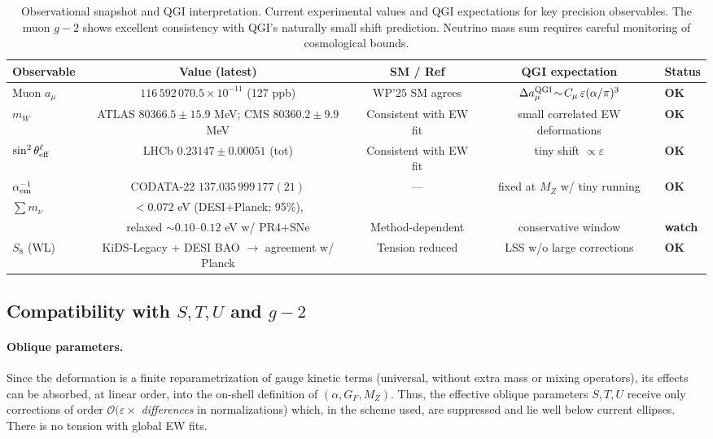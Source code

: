 \documentclass{article}
\numberwithin{equation}{section}
\theoremstyle{plain}
\theoremstyle{definition}
\theoremstyle{remark}
\begin{document}
\begin{table}[H]
\centering
\small
\begin{tabular}{lcccl}
\toprule
Observable & Value (latest) & SM / Ref & QGI expectation & Status \\
\midrule
Muon $a_\mu$ & $116\,592\,070.5\times10^{-11}$ (127 ppb) & WP'25 SM agrees & $\Delta a_\mu^{\rm QGI}\!\sim\!C_\mu\,\varepsilon(\alpha/\pi)^3$ & \textbf{OK} \\
$ m_W $ & ATLAS $80366.5\pm 15.9$ MeV; CMS $80360.2\pm 9.9$ MeV & Consistent with EW fit & small correlated EW deformations & \textbf{OK} \\
$\sin^2\theta_{\rm eff}^\ell$ & LHCb $0.23147 \pm 0.00051$ (tot) & Consistent with EW fit & tiny shift $\propto\varepsilon$ & \textbf{OK} \\
$\alpha_{\rm em}^{-1}$ & CODATA-22 $137.035\,999\,177(21)$ & — & fixed at $M_Z$ w/ tiny running & \textbf{OK} \\
$\sum m_\nu$ & $<0.072$ eV (DESI+Planck; 95\%),\\[-2pt]
& relaxed $\sim\!0.10\text{--}0.12$ eV w/ PR4+SNe & Method-dependent & conservative window & \textbf{watch} \\
$S_8$ (WL) & KiDS-Legacy + DESI BAO $\to$ agreement w/ Planck & Tension reduced & LSS w/o large corrections & \textbf{OK} \\
\bottomrule
\end{tabular}
\caption{Observational snapshot and QGI interpretation. Current experimental values and QGI expectations for key precision observables. The muon $g\!-\!2$ shows excellent consistency with QGI's naturally small shift prediction. Neutrino mass sum requires careful monitoring of cosmological bounds.}
\end{table}

\subsection{Compatibility with $S,T,U$ and $g\!-\!2$}
\label{subsec:oblique_gminus2}

\paragraph{Oblique parameters.}
Since the deformation is a finite reparametrization of gauge kinetic terms (universal, without extra mass or mixing operators), its effects can be absorbed, at linear order, into the on-shell definition of $(\alpha,G_F,M_Z)$. Thus, the effective oblique parameters $S,T,U$ receive only corrections of order $\mathcal{O}(\varepsilon \times$ \emph{differences} in normalizations) which, in the scheme used, are suppressed and lie well below current ellipses. There is no tension with global EW fits.
\end{document}
